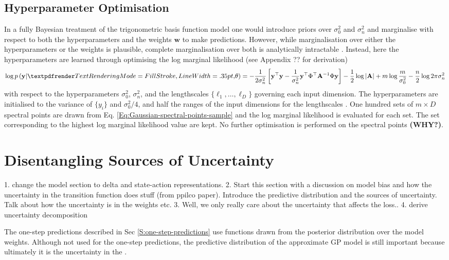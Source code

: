 \subsection{Hyperparameter Optimisation}
In a fully Bayesian treatment of the trigonometric basis function model one would introduce priors over $\sigma_{0}^2$ and $\sigma_{n}^2$ and marginalise with respect to both the hyperparameters and the weights $\mathbf{w}$ to make predictions. However, while marginalisation over either the hyperparameters or the weights is plausible, complete marginalisation over both is analytically intractable \cite{bishop2006pattern}. Instead, here the hyperparameters are learned through optimising the log marginal likelihood (see Appendix ?? for derivation)
\begin{equation}
    \log p\left(\mathbf{y}|\boldgreek{\theta}\right) = -\frac{1}{2\sigma_{n}^{2}}\left[\mathbf{y}^{\top}\mathbf{y} - \frac{1}{\sigma_{n}^{2}}\mathbf{y}^{\top}\Phi^{\top}\mathbf{A}^{-1}\Phi\mathbf{y}\right] - \frac{1}{2}\log|\mathbf{A}| + m\log\frac{m}{\sigma_{0}^{2}} - \frac{n}{2}\log2\pi\sigma_{n}^{2}
\end{equation}
with respect to the hyperparameters $\sigma_{0}^{2}$, $\sigma_{n}^{2}$, and the lengthscales $\{\ell_{1},\dots,\ell_{D}\}$ governing each input dimension. The hyperparameters are initialised to the variance of $\{y_{i}\}$ and $\sigma_{0}^2/4$, and half the ranges of the input dimensions for the lengthscales \cite{quia2010sparse}. One hundred sets of $m\times D$ spectral points are drawn from Eq. \ref{Eq:Gaussian-spectral-points-sample} and the log marginal likelihood is evaluated for each set. The set corresponding to the highest log marginal likelihood value are kept. No further optimisation is performed on the spectral points \textbf{(WHY?)}.


\section{Disentangling Sources of Uncertainty}
\label{S:disentangling-uncertainty}
1. change the model section to delta and state-action representations. 
2. Start this section with a discussion on model bias and how the uncertainty in the transition function does stuff (from ppilco paper). 
Introduce the predictive distribution and the sources of uncertainty. Talk about how the uncertainty is in the weights etc.
3. Well, we only really care about the uncertainty that affects the loss..
4. derive uncertainty decomposition

The one-step predictions described in Sec \ref{S:one-step-predictions} use functions drawn from the posterior distribution over the model weights. Although not used for the one-step predictions, the predictive distribution of the approximate GP model is still important because ultimately it is the uncertainty in the .

